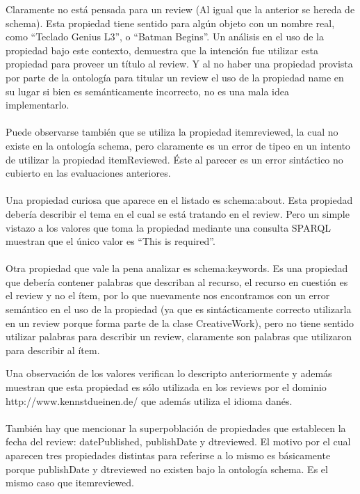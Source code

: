  Claramente no está pensada para un review (Al igual que la anterior se hereda de schema). Esta propiedad tiene sentido para algún objeto con un nombre real, como ``Teclado Genius L3'', o ``Batman Begins''.
 Un análisis en el uso de la propiedad bajo este contexto, demuestra que la intención fue utilizar esta propiedad para proveer un título al review.
 Y al no haber una propiedad provista por parte de la ontología para titular un review el uso de la propiedad name en su lugar si bien 
 es semánticamente incorrecto, no es una mala idea implementarlo.
 \\\\
 Puede observarse también que se utiliza la propiedad itemreviewed, la cual no existe en la ontología schema, pero claramente es un 
 error de tipeo en un intento de utilizar la propiedad itemReviewed. Éste al parecer es un error sintáctico no cubierto en las evaluaciones 
 anteriores.
 \\\\
 Una propiedad curiosa que aparece en el listado es schema:about. Esta propiedad debería describir el tema en el cual 
 se está tratando en el review. Pero un simple vistazo a los valores que toma la propiedad mediante una consulta SPARQL muestran que 
 el único valor es ``This is required''.
 \\\\
 Otra propiedad que vale la pena analizar es schema:keywords. Es una propiedad que debería contener palabras que describan al recurso, 
 el recurso en cuestión es el review y no el ítem, por lo que nuevamente nos encontramos con un error semántico en el uso de la propiedad (ya que es sintácticamente 
 correcto utilizarla en un review porque forma parte de la clase CreativeWork), pero no tiene sentido utilizar palabras para describir un review, claramente 
 son palabras que utilizaron para describir al ítem.
 
 Una observación de los valores verifican lo descripto anteriormente y además muestran que esta propiedad es sólo utilizada en los reviews por el dominio 
 \\\noindent http://www.kennstdueinen.de/ que además utiliza el idioma danés.
 \\\\
 También hay que mencionar la superpoblación de propiedades que establecen la fecha del review: datePublished, publishDate y dtreviewed.
 El motivo por el cual aparecen tres propiedades distintas para referirse a lo mismo es básicamente porque publishDate y dtreviewed no existen bajo la 
 ontología schema. Es el mismo caso que itemreviewed. 
 
